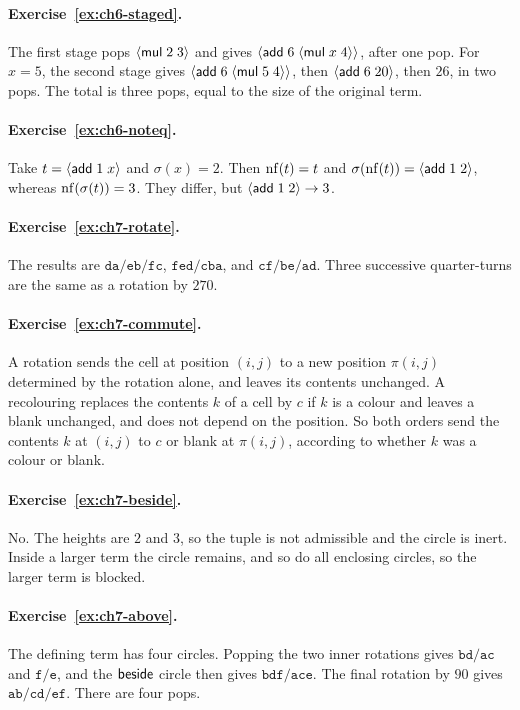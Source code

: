 \paragraph{Exercise~\ref{ex:ch6-staged}.}
The first stage pops $\langle \mathsf{mul}\; 2\; 3\rangle$ and gives $\langle \mathsf{add}\; 6\; \langle \mathsf{mul}\; x\; 4\rangle\rangle$, after one pop. For $x=5$, the second stage gives $\langle \mathsf{add}\; 6\; \langle \mathsf{mul}\; 5\; 4\rangle\rangle$, then $\langle \mathsf{add}\; 6\; 20\rangle$, then $26$, in two pops. The total is three pops, equal to the size of the original term.

\paragraph{Exercise~\ref{ex:ch6-noteq}.}
Take $t=\langle \mathsf{add}\; 1\; x\rangle$ and $\sigma(x)=2$. Then $\operatorname{nf}(t)=t$ and $\sigma(\operatorname{nf}(t))=\langle \mathsf{add}\; 1\; 2\rangle$, whereas $\operatorname{nf}(\sigma(t))=3$. They differ, but $\langle \mathsf{add}\; 1\; 2\rangle\to3$.

\paragraph{Exercise~\ref{ex:ch7-rotate}.}
The results are $\mathtt{da/eb/fc}$, $\mathtt{fed/cba}$, and $\mathtt{cf/be/ad}$. Three successive quarter-turns are the same as a rotation by $270$.

\paragraph{Exercise~\ref{ex:ch7-commute}.}
A rotation sends the cell at position $(i,j)$ to a new position $\pi(i,j)$ determined by the rotation alone, and leaves its contents unchanged. A recolouring replaces the contents $k$ of a cell by $c$ if $k$ is a colour and leaves a blank unchanged, and does not depend on the position. So both orders send the contents $k$ at $(i,j)$ to $c$ or blank at $\pi(i,j)$, according to whether $k$ was a colour or blank.

\paragraph{Exercise~\ref{ex:ch7-beside}.}
No. The heights are $2$ and $3$, so the tuple is not admissible and the circle is inert. Inside a larger term the circle remains, and so do all enclosing circles, so the larger term is blocked.

\paragraph{Exercise~\ref{ex:ch7-above}.}
The defining term has four circles. Popping the two inner rotations gives $\mathtt{bd/ac}$ and $\mathtt{f/e}$, and the $\mathsf{beside}$ circle then gives $\mathtt{bdf/ace}$. The final rotation by $90$ gives $\mathtt{ab/cd/ef}$. There are four pops.

